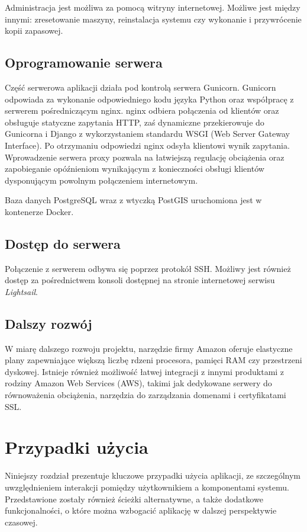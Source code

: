 \documentclass[licencjacka]{pracamgr}
\begin{document}
Administracja jest możliwa za pomocą witryny internetowej. Możliwe jest między innymi: zresetowanie maszyny, reinstalacja systemu czy wykonanie i przywrócenie kopii zapasowej.

\section{Oprogramowanie serwera}

Część serwerowa aplikacji działa pod kontrolą serwera Gunicorn. Gunicorn odpowiada za wykonanie odpowiedniego kodu języka Python oraz współpracę z serwerem pośredniczącym nginx. nginx odbiera połączenia od klientów oraz obsługuje statyczne zapytania HTTP, zaś dynamiczne przekierowuje do Gunicorna i Django z wykorzystaniem standardu WSGI (Web Server Gateway Interface). Po otrzymaniu odpowiedzi nginx odsyła klientowi wynik zapytania. Wprowadzenie serwera proxy pozwala na łatwiejszą regulację obciążenia oraz zapobieganie opóźnieniom wynikającym z konieczności obsługi klientów dysponującym powolnym połączeniem internetowym.

Baza danych PostgreSQL wraz z wtyczką PostGIS uruchomiona jest w kontenerze Docker.

\section{Dostęp do serwera}
Połączenie z serwerem odbywa się poprzez protokół SSH\@. Możliwy jest również dostęp za pośrednictwem konsoli dostępnej na stronie internetowej serwisu \textit{Lightsail}.

\section{Dalszy rozwój}
W miarę dalszego rozwoju projektu, narzędzie firmy Amazon oferuje elastyczne plany zapewniające większą liczbę rdzeni procesora, pamięci RAM czy przestrzeni dyskowej. Istnieje również możliwość łatwej integracji z innymi produktami z rodziny Amazon Web Services (AWS), takimi jak dedykowane serwery do równoważenia obciążenia, narzędzia do zarządzania domenami i certyfikatami SSL\@.


\chapter{Przypadki użycia}\label{r:usecase}
Niniejszy rozdział prezentuje kluczowe przypadki użycia aplikacji, ze szczególnym uwzględnieniem interakcji pomiędzy użytkownikiem a komponentami systemu. Przedstawione zostały również ścieżki alternatywne, a także dodatkowe funkcjonalności, o które można wzbogacić aplikację w dalszej perspektywie czasowej.
\end{document}
